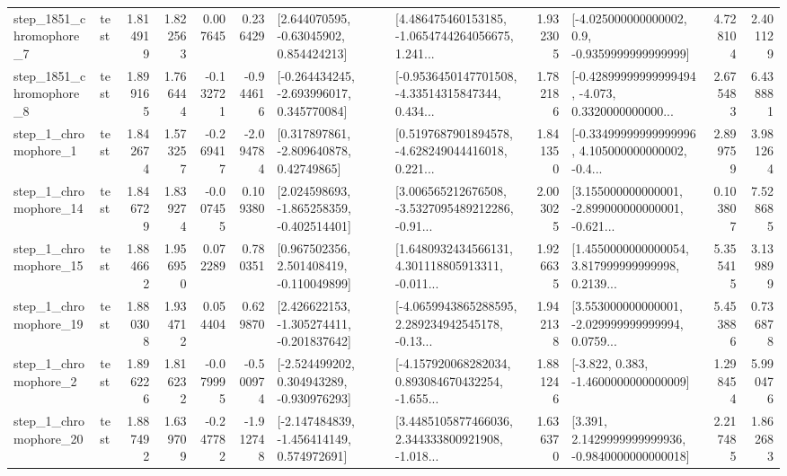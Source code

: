 \begin{tabular}{llrrrrllrlrr}
  step\_1851\_chromophore\_7 &      test &      1.814919 &    1.822563 &      0.007645 &  0.236429 &     [2.644070595, -0.63045902, 0.854424213] &  [4.486475460153185, -1.0654744264056675, 1.241... &       1.932305 &     [-4.025000000000002, 0.9, -0.9359999999999999] &            4.728104 &          2.401129 \\
  step\_1851\_chromophore\_8 &      test &      1.899165 &    1.766444 &     -0.132721 & -0.944616 &   [-0.264434245, -2.693996017, 0.345770084] &  [-0.9536450147701508, -4.33514315847344, 0.434... &       1.782186 &  [-0.42899999999999494, -4.073, 0.3320000000000... &            2.675483 &          6.438881 \\
     step\_1\_chromophore\_1 &      test &      1.842674 &    1.573257 &     -0.269417 & -2.094784 &     [0.317897861, -2.809640878, 0.42749865] &  [0.5197687901894578, -4.628249044416018, 0.221... &       1.841350 &  [-0.33499999999999996, 4.105000000000002, -0.4... &            2.899759 &          3.981264 \\
    step\_1\_chromophore\_14 &      test &      1.846729 &    1.839274 &     -0.007455 &  0.109380 &   [2.024598693, -1.865258359, -0.402514401] &  [3.006565212676508, -3.5327095489212286, -0.91... &       2.003025 &  [3.155000000000001, -2.899000000000001, -0.621... &            0.103807 &          7.528685 \\
    step\_1\_chromophore\_15 &      test &      1.884662 &    1.956950 &      0.072289 &  0.780351 &    [0.967502356, 2.501408419, -0.110049899] &  [1.6480932434566131, 4.301118805913311, -0.011... &       1.926635 &  [1.4550000000000054, 3.817999999999998, 0.2139... &            5.355415 &          3.139899 \\
    step\_1\_chromophore\_19 &      test &      1.880308 &    1.934712 &      0.054404 &  0.629870 &   [2.426622153, -1.305274411, -0.201837642] &  [-4.0659943865288595, 2.289234942545178, -0.13... &       1.942138 &  [3.553000000000001, -2.029999999999994, 0.0759... &            5.453886 &          0.736878 \\
     step\_1\_chromophore\_2 &      test &      1.896226 &    1.816232 &     -0.079995 & -0.500974 &   [-2.524499202, 0.304943289, -0.930976293] &  [-4.157920068282034, 0.893084670432254, -1.655... &       1.881246 &               [-3.822, 0.383, -1.4600000000000009] &            1.298454 &          5.990476 \\
    step\_1\_chromophore\_20 &      test &      1.887492 &    1.639709 &     -0.247782 & -1.912748 &   [-2.147484839, -1.456414149, 0.574972691] &  [3.4485105877466036, 2.344333800921908, -1.018... &       1.636370 &   [3.391, 2.1429999999999936, -0.9840000000000018] &            2.217485 &          1.862683 \\

\end{tabular}
